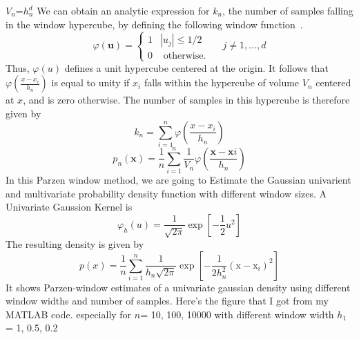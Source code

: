 \begin{spacing}{1.5}
                                                  
                                                 $V_{n}$=$h_{n}^{d}$
We can obtain an analytic expression for $k_{n}$, the number of samples falling in the window hypercube, by defining the following window function~\cite{parzenwindow}.
\begin{equation}
\varphi(\mathbf{u})=\left\{\begin{array}{ll}
1 & \left|u_{j}\right| \leq 1 / 2 \\
0 & \text { otherwise. }
\end{array} \quad j \neq 1, \ldots, d\right.
\end{equation}
Thus, $\varphi(u)$ defines a unit hypercube centered at the origin. It follows that $\varphi\left(\frac{x-x_{i}}{h_{n}}\right)$ is equal to unity if $x_{i}$ falls within the hypercube of volume $V_{n}$ centered at $x$, and is zero otherwise. The number of samples in this hypercube is therefore given by
\begin{equation}
k_{n}=\sum_{i=1}^{n} \varphi\left(\frac{x-x_{i}}{h_{n}}\right)
\end{equation}
\begin{equation}
p_{n}(\mathbf{x})=\frac{1}{n} \sum_{i=1}^{n} \frac{1}{V_{n}} \varphi\left(\frac{\mathbf{x}-\mathbf{x}{i}}{h_{n}}\right)
\end{equation}
In this Parzen window method, we are going to Estimate the Gaussian univarient and multivariate probability density function with different window sizes.
A Univariate Gaussion Kernel is
\begin{equation}
\varphi_{h}(u)=\frac{1}{\sqrt{2 \pi}} \exp \left[-\frac{1}{2} u^{2}\right]
\end{equation}
The resulting density is given by
\begin{equation}
p(x)=\frac{1}{n} \sum_{i=1}^{n} \frac{1}{h_{n} \sqrt{2 \pi}} \exp \left[-\frac{1}{2 h_{n}^{2}}\left(\mathrm{x}-\mathrm{x}_{i}\right)^{2}\right]
\end{equation}
It shows Parzen-window estimates of a univariate gaussian density using different window widths and number of samples. Here's the figure that I got from my MATLAB code. especially for $n$= 10, 100, 10000 with different window width $h_{1}$= 1, 0.5, 0.2

\end{spacing}
